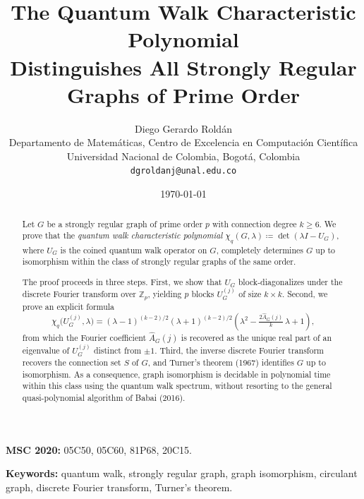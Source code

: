 \documentclass[12pt]{article}
\newcommand{\Z}{\mathbb{Z}}
\begin{document}
\title{The Quantum Walk Characteristic Polynomial\\
  Distinguishes All Strongly Regular Graphs of Prime Order}

\author{Diego Gerardo Rold\'an\\
  \small Departamento de Matem\'aticas,
  Centro de Excelencia en Computaci\'on Cient\'ifica\\
  \small Universidad Nacional de Colombia, Bogot\'a, Colombia\\
  \small \texttt{dgroldanj@unal.edu.co}
}

\date{\today}

\maketitle

\begin{abstract}
Let $G$ be a strongly regular graph of prime order $p$ with connection
degree $k \geq 6$.  We prove that the \emph{quantum walk characteristic
polynomial} $\chi_q(G,\lambda) \coloneqq \det(\lambda I - U_G)$, where
$U_G$ is the coined quantum walk operator on $G$, completely determines $G$
up to isomorphism within the class of strongly regular graphs of the same
order.

The proof proceeds in three steps.  First, we show that $U_G$
block-diagonalizes under the discrete Fourier transform over $\Z_p$,
yielding $p$ blocks $U_G^{(j)}$ of size $k \times k$.  Second, we prove
an explicit formula
\[
  \chi_q\!\bigl(U_G^{(j)}, \lambda\bigr) =
  (\lambda-1)^{(k-2)/2}(\lambda+1)^{(k-2)/2}
  \!\left(\lambda^2 - \tfrac{2\widehat{A}_G(j)}{k}\,\lambda + 1\right),
\]
from which the Fourier coefficient $\widehat{A}_G(j)$ is recovered as the
unique real part of an eigenvalue of $U_G^{(j)}$ distinct from $\pm 1$.  Third, the
inverse discrete Fourier transform recovers the connection set $S$ of $G$,
and Turner's theorem (1967) identifies $G$ up to isomorphism.  As a
consequence, graph isomorphism is decidable in polynomial time within this
class using the quantum walk spectrum, without resorting to the general
quasi-polynomial algorithm of Babai (2016).
\end{abstract}

\medskip
\noindent\textbf{MSC 2020:} 05C50, 05C60, 81P68, 20C15.

\medskip
\noindent\textbf{Keywords:} quantum walk, strongly regular graph, graph isomorphism,
circulant graph, discrete Fourier transform, Turner's theorem.
\end{document}
